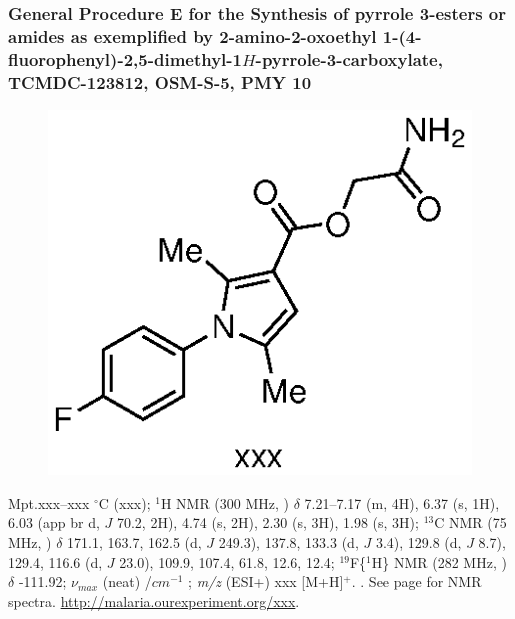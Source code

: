 \documentclass[12pt, a4paper,titlepage]{article}
\begin{document}
\subsubsection*{General Procedure E for the Synthesis of pyrrole 3-esters or amides as exemplified by 2-amino-2-oxoethyl 1-(4-fluorophenyl)-2,5-dimethyl-1$H$-pyrrole-3-carboxylate, TCMDC-123812, OSM-S-5, PMY 10}
\label{exp:PMY10}
	\begin{figure}[H]
	\begin{center}
	\includegraphics{exp/PMY10.eps}
	\end{center}
	\vspace{-25pt}	
	\end{figure}	

Mpt.xxx--xxx $^\circ$C (xxx); 
$^1$H NMR (300 MHz, ) $\delta$ 7.21--7.17 (m, 4H), 6.37 (s, 1H), 6.03 (app br d, $J$ 70.2, 2H), 4.74 (s, 2H), 2.30 (s, 3H), 1.98 (s, 3H); 
  $^{13}$C NMR (75 MHz, ) $\delta$ 171.1, 163.7, 162.5 (d, $J$ 249.3), 137.8, 133.3 (d, $J$ 3.4), 129.8 (d, $J$ 8.7), 129.4, 116.6 (d, $J$ 23.0), 109.9, 107.4, 61.8, 12.6, 12.4; 
$^{19}$F\{$^1$H\} NMR (282 MHz, ) $\delta$ -111.92;
 $\nu_{max}$ (neat) /$cm^{-1}$ ; 
\emph{m/z} (ESI+) xxx [M+H]$^+$.
. 
See page \pageref{spec:PMY10} for NMR spectra.
\url{http://malaria.ourexperiment.org/xxx}. 
\end{document}
